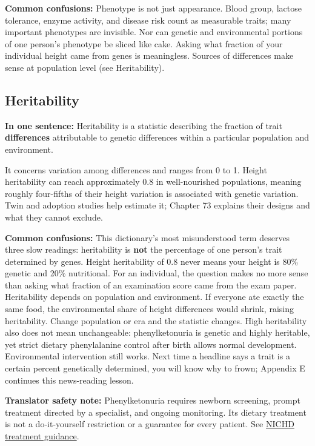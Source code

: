 \textbf{Common confusions:} Phenotype is not just appearance. Blood group, lactose tolerance, enzyme activity, and disease risk count as measurable traits; many important phenotypes are invisible. Nor can genetic and environmental portions of one person's phenotype be sliced like cake. Asking what fraction of your individual height came from genes is meaningless. Sources of differences make sense at population level (see Heritability).

\subsection{Heritability}

\textbf{In one sentence:} Heritability is a statistic describing the fraction of trait \textbf{differences} attributable to genetic differences within a particular population and environment.

It concerns variation among differences and ranges from 0 to 1. Height heritability can reach approximately 0.8 in well-nourished populations, meaning roughly four-fifths of their height variation is associated with genetic variation. Twin and adoption studies help estimate it; Chapter 73 explains their designs and what they cannot exclude.

\textbf{Common confusions:} This dictionary's most misunderstood term deserves three slow readings: heritability is \textbf{not} the percentage of one person's trait determined by genes. Height heritability of 0.8 never means your height is 80\% genetic and 20\% nutritional. For an individual, the question makes no more sense than asking what fraction of an examination score came from the exam paper. Heritability depends on population and environment. If everyone ate exactly the same food, the environmental share of height differences would shrink, raising heritability. Change population or era and the statistic changes. High heritability also does not mean unchangeable: phenylketonuria is genetic and highly heritable, yet strict dietary phenylalanine control after birth allows normal development. Environmental intervention still works. Next time a headline says a trait is a certain percent genetically determined, you will know why to frown; Appendix E continues this news-reading lesson.

\textbf{Translator safety note:} Phenylketonuria requires newborn screening, prompt treatment directed by a specialist, and ongoing monitoring. Its dietary treatment is not a do-it-yourself restriction or a guarantee for every patient. See \href{https://www.nichd.nih.gov/health/topics/pku/conditioninfo/treatments}{NICHD treatment guidance}.

